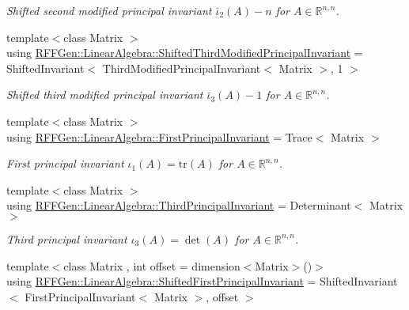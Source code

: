\begin{DoxyCompactItemize}
\begin{DoxyCompactList}\small\item\em Shifted second modified principal invariant $ \bar\iota_2(A) - n $ for $ A\in\mathbb{R}^{n,n} $. \end{DoxyCompactList}\item 
\hypertarget{group__InvariantGroup_ga915154ab519db597193b2dcdf2e0368c}{{\footnotesize template$<$class Matrix $>$ }\\using \hyperlink{group__InvariantGroup_ga915154ab519db597193b2dcdf2e0368c}{R\-F\-F\-Gen\-::\-Linear\-Algebra\-::\-Shifted\-Third\-Modified\-Principal\-Invariant} = Shifted\-Invariant$<$ Third\-Modified\-Principal\-Invariant$<$ Matrix $>$, 1 $>$}\label{group__InvariantGroup_ga915154ab519db597193b2dcdf2e0368c}

\begin{DoxyCompactList}\small\item\em Shifted third modified principal invariant $ \bar\iota_3(A) - 1 $ for $ A\in\mathbb{R}^{n,n} $. \end{DoxyCompactList}\item 
\hypertarget{group__InvariantGroup_ga00013718baca174259e8699c7a5d9dc4}{{\footnotesize template$<$class Matrix $>$ }\\using \hyperlink{group__InvariantGroup_ga00013718baca174259e8699c7a5d9dc4}{R\-F\-F\-Gen\-::\-Linear\-Algebra\-::\-First\-Principal\-Invariant} = Trace$<$ Matrix $>$}\label{group__InvariantGroup_ga00013718baca174259e8699c7a5d9dc4}

\begin{DoxyCompactList}\small\item\em First principal invariant $ \iota_1(A)=\mathrm{tr}(A) $ for $A\in\mathbb{R}^{n,n}$. \end{DoxyCompactList}\item 
\hypertarget{group__InvariantGroup_ga3ace6e6d227a8bcaec150749f56e4886}{{\footnotesize template$<$class Matrix $>$ }\\using \hyperlink{group__InvariantGroup_ga3ace6e6d227a8bcaec150749f56e4886}{R\-F\-F\-Gen\-::\-Linear\-Algebra\-::\-Third\-Principal\-Invariant} = Determinant$<$ Matrix $>$}\label{group__InvariantGroup_ga3ace6e6d227a8bcaec150749f56e4886}

\begin{DoxyCompactList}\small\item\em Third principal invariant $ \iota_3(A)=\det(A) $ for $A\in\mathbb{R}^{n,n}$. \end{DoxyCompactList}\item 
\hypertarget{group__InvariantGroup_ga7f9e376f62d3a241e6c2a7ffbbbcde11}{{\footnotesize template$<$class Matrix , int offset = dimension$<$\-Matrix$>$()$>$ }\\using \hyperlink{group__InvariantGroup_ga7f9e376f62d3a241e6c2a7ffbbbcde11}{R\-F\-F\-Gen\-::\-Linear\-Algebra\-::\-Shifted\-First\-Principal\-Invariant} = Shifted\-Invariant$<$ First\-Principal\-Invariant$<$ Matrix $>$, offset $>$}\label{group__InvariantGroup_ga7f9e376f62d3a241e6c2a7ffbbbcde11}


\end{DoxyCompactItemize}
